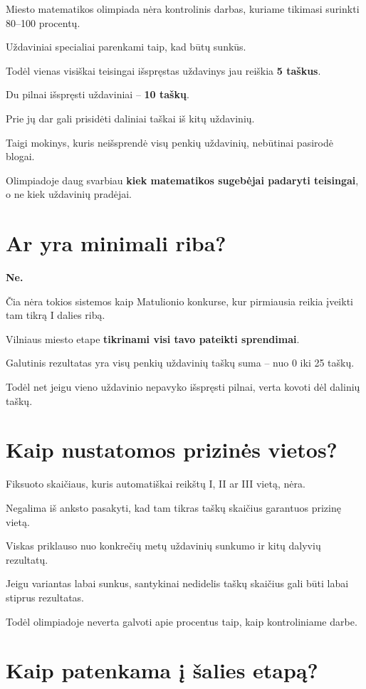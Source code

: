 \documentclass[11pt,a4paper]{article}
\begin{document}
Miesto matematikos olimpiada nėra kontrolinis darbas, kuriame tikimasi surinkti 80--100 procentų.

Uždaviniai specialiai parenkami taip, kad būtų sunkūs.

Todėl vienas visiškai teisingai išspręstas uždavinys jau reiškia \textbf{5 taškus}.

Du pilnai išspręsti uždaviniai -- \textbf{10 taškų}.

Prie jų dar gali prisidėti daliniai taškai iš kitų uždavinių.

Taigi mokinys, kuris neišsprendė visų penkių uždavinių, nebūtinai pasirodė blogai.

Olimpiadoje daug svarbiau \textbf{kiek matematikos sugebėjai padaryti teisingai}, o ne kiek uždavinių pradėjai.

\section{Ar yra minimali riba?}

\textbf{Ne.}

Čia nėra tokios sistemos kaip Matulionio konkurse, kur pirmiausia reikia įveikti tam tikrą I dalies ribą.

Vilniaus miesto etape \textbf{tikrinami visi tavo pateikti sprendimai}.

Galutinis rezultatas yra visų penkių uždavinių taškų suma -- nuo 0 iki 25 taškų.

Todėl net jeigu vieno uždavinio nepavyko išspręsti pilnai, verta kovoti dėl dalinių taškų.

\section{Kaip nustatomos prizinės vietos?}

Fiksuoto skaičiaus, kuris automatiškai reikštų I, II ar III vietą, nėra.

Negalima iš anksto pasakyti, kad tam tikras taškų skaičius garantuos prizinę vietą.

Viskas priklauso nuo konkrečių metų uždavinių sunkumo ir kitų dalyvių rezultatų.

Jeigu variantas labai sunkus, santykinai nedidelis taškų skaičius gali būti labai stiprus rezultatas.

Todėl olimpiadoje neverta galvoti apie procentus taip, kaip kontroliniame darbe.

\section{Kaip patenkama į šalies etapą?}
\end{document}
